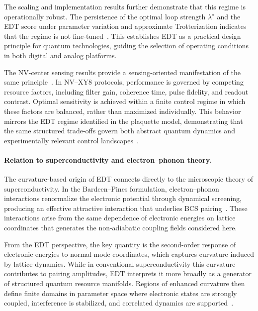 The scaling and implementation results further demonstrate that this regime is operationally robust. The persistence of the optimal loop strength $\lambda^\star$ and the EDT score under parameter variation and approximate Trotterization indicates that the regime is not fine-tuned~\cite{Lloyd1996,Childs2019}. This establishes EDT as a practical design principle for quantum technologies, guiding the selection of operating conditions in both digital and analog platforms.

The NV-center sensing results provide a sensing-oriented manifestation of the same principle~\cite{Degen2017,Barry2020}. In NV--XY8 protocols, performance is governed by competing resource factors, including filter gain, coherence time, pulse fidelity, and readout contrast. Optimal sensitivity is achieved within a finite control regime in which these factors are balanced, rather than maximized individually. This behavior mirrors the EDT regime identified in the plaquette model, demonstrating that the same structured trade-offs govern both abstract quantum dynamics and experimentally relevant control landscapes~\cite{Casola2018}.

\paragraph*{Relation to superconductivity and electron--phonon theory.}

The curvature-based origin of EDT connects directly to the microscopic theory of superconductivity. In the Bardeen--Pines formulation, electron--phonon interactions renormalize the electronic potential through dynamical screening, producing an effective attractive interaction that underlies BCS pairing~\cite{BardeenPines1955,BCS1957}. These interactions arise from the same dependence of electronic energies on lattice coordinates that generates the non-adiabatic coupling fields considered here.

From the EDT perspective, the key quantity is the second-order response of electronic energies to normal-mode coordinates, which captures curvature induced by lattice dynamics. While in conventional superconductivity this curvature contributes to pairing amplitudes, EDT interprets it more broadly as a generator of structured quantum resource manifolds. Regions of enhanced curvature then define finite domains in parameter space where electronic states are strongly coupled, interference is stabilized, and correlated dynamics are supported~\cite{Giustino2017}.


